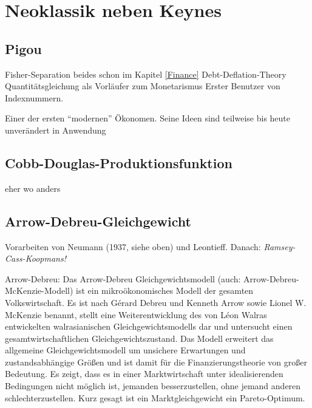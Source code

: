 %
%
%

\chapter{Neoklassik neben Keynes}
\label{Neoklassik_nach1945}

\section{Pigou}


Fisher-Separation
beides schon im Kapitel \ref{Finance}
Debt-Deflation-Theory
Quantitätsgleichung als Vorläufer zum Monetarismus
Erster Benutzer von Indexnummern.

Einer der ersten "`modernen"' Ökonomen. Seine Ideen sind teilweise bis heute unverändert in Anwendung

\textcite{Tobin2005}

\section{Cobb-Douglas-Produktionsfunktion} \label{sec: Cobb-Douglas-Produktionsfunktion}
eher wo anders



\section{Arrow-Debreu-Gleichgewicht}
\label{Arrow-Debreu}
Vorarbeiten von Neumann (1937, siehe oben) und Leontieff. Danach: \textit{Ramsey-Cass-Koopmans!}

Arrow-Debreu:
Das Arrow-Debreu Gleichgewichtsmodell (auch: Arrow-Debreu-McKenzie-Modell) ist ein mikroökonomisches Modell der gesamten Volkswirtschaft. Es ist nach Gérard Debreu und Kenneth Arrow sowie Lionel W. McKenzie benannt, stellt eine Weiterentwicklung des von Léon Walras entwickelten walrasianischen Gleichgewichtsmodells dar und untersucht einen gesamtwirtschaftlichen Gleichgewichtszustand. 
Das Modell erweitert das allgemeine Gleichgewichtsmodell um unsichere Erwartungen und zustandsabhängige Größen und ist damit für die Finanzierungstheorie von großer Bedeutung. Es zeigt, dass es in einer Marktwirtschaft unter idealisierenden Bedingungen nicht möglich ist, jemanden besserzustellen, ohne jemand anderen schlechterzustellen. Kurz gesagt ist ein Marktgleichgewicht ein Pareto-Optimum. 


